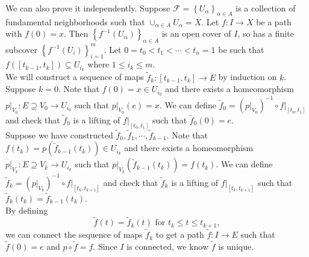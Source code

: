 \documentclass{report}
\begin{document}
\begin{prf}
	We can also prove it independently. Suppose $\mathcal{F}=\left\{U_\alpha\right\}_{\alpha\in A}$ is a collection of fundamental neighborhoods such that $\cup_{\alpha\in A}U_\alpha=X$. Let $f:I\to X$ be a path with $f(0)=x$. Then $\left\{f^{-1}(U_\alpha)\right\}_{\alpha\in A}$ is an open cover of $I$, so has a finite subcover $\left\{f^{-1}(U_{i})\right\}_{i=1}^m$. Let $0=t_0<t_1<\cdots<t_n=1$ be such that $f([t_{k-1},t_k])\subseteq U_{i_k}$ where $1\le i_k \le m$. \\
	We will construct a sequence of maps $\widetilde{f}_k:[t_{k-1},t_k]\to E$ by induction on $k$. Suppose $k=0$. Note that $f(0)=x\in U_{i_0}$ and there exists a homeomorphism $\left.p\right|_{V_0}: E\supseteq V_0\to U_{i_0}$ such that $\left.p\right|_{V_0}(e)=x$. We can define $\widetilde{f}_0=\left(\left.p\right|_{V_0}\right)^{-1}\circ f|_{[t_0,t_1]}$ and check that $\widetilde{f}_0$ is a lifting of $f|_{[t_0,t_1]}$ such that $\widetilde{f}_0(0)=e$. \\
	Suppose we have constructed $\widetilde{f}_0,\widetilde{f}_1,\cdots,\widetilde{f}_{k-1}$. Note that $f(t_{k})=p\left(\widetilde{f}_{k-1}(t_k)\right)\in U_{i_k}$ and there exists a homeomorphism $\left.p\right|_{V_k}: E\supseteq V_k\to U_{i_k}$ such that $\left.p\right|_{V_{k}}\left(\widetilde{f}_{k-1}(t_k)\right)=f(t_k)$. We can define $\widetilde{f}_k=\left(\left.p\right|_{V_k}\right)^{-1}\circ f|_{[t_k,t_{k+1}]}$ and check that $\widetilde{f}_k$ is a lifting of $f|_{[t_k,t_{k+1}]}$ such that $\widetilde{f}_k(t_{k})=\widetilde{f}_{k-1}(t_{k})$. \\
	By defining
	\[
		\widetilde{f}(t)=\widetilde{f}_k(t)\text{ for }t_{k}\le t\le t_{k+1},
	\]
	we can connect the sequence of maps $\widetilde{f}_k$ to get a path $\widetilde{f}:I\to E$ such that $\widetilde{f}(0)=e$ and $p\circ \widetilde{f}=f$. Since $I$ is connected, we know $\widetilde{f}$ is unique.
\end{prf}
\end{document}
